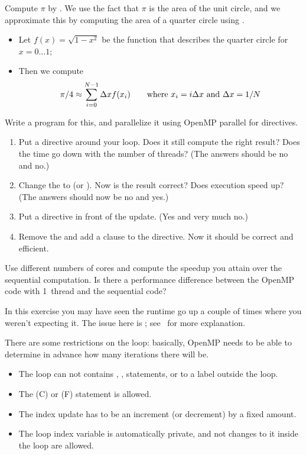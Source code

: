 \begin{exercise}
  \label{ex:omp-pi}
  Compute $\pi$ by . We use the fact that $\pi$
  is the area of the unit circle, and we approximate this by computing
  the area of a quarter circle using .
  \begin{itemize}
  \item Let $f(x)=\sqrt{1-x^2}$ be the function that describes the
    quarter circle for $x=0\ldots 1$;
  \item Then we compute \[ \pi/4\approx\sum_{i=0}^{N-1} \Delta x
    f(x_i) \qquad \hbox{where $x_i=i\Delta x$ and $\Delta x=1/N$} \]
  \end{itemize}
  Write a program for this, and parallelize it using OpenMP parallel
  for directives.
  \begin{enumerate}
  \item Put a  directive around your loop. Does it still
    compute the right result? Does the time go down with the number of
    threads? (The answers should be no and no.)
  \item Change the  to  (or ). Now is the result correct? Does execution speed up? (The
    answers should now be no and yes.)
  \item Put a  directive in front of the update. (Yes and
    very much no.)
  \item Remove the  and add a clause
     to the  directive.
    Now it should be correct and efficient.
  \end{enumerate}
  Use different numbers of cores and compute the
  speedup you attain over the sequential computation. Is there a
  performance difference between the OpenMP code with 1~thread and the
  sequential code?
\end{exercise}

\begin{remark}
  In this exercise you may have seen the runtime go up a couple of times
  where you weren't expecting it. The issue here is ; see~ for more explanation.
\end{remark}

There are some restrictions on the loop: basically, OpenMP needs to be
able to determine in advance how many iterations there will be.
\begin{itemize}
\item The loop can not contains , ,  statements, or
   to a label outside the loop.
\item The  (C) or  (F) statement is allowed.
\item The index update has to be an increment (or decrement) by a fixed amount.
\item The loop index variable is automatically private, and not changes to it
  inside the loop are allowed.
\end{itemize}

